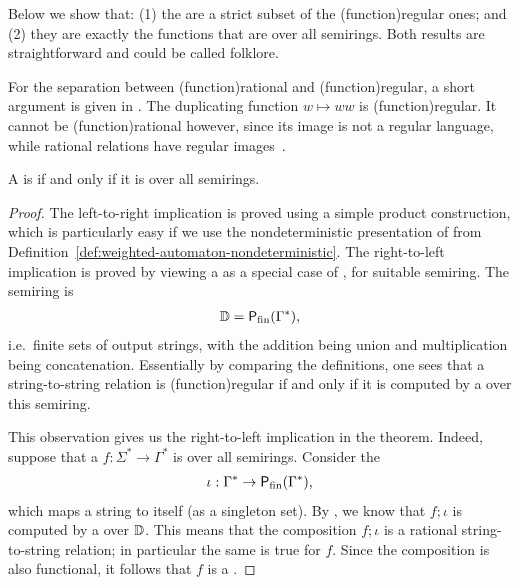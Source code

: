 \AP
Below we show that: (1) the  are a
strict subset of the \kl(function){regular} ones; and (2) they are exactly the
functions that are  over all semirings. Both results are
straightforward and could be called folklore.

\begin{myexample}
    For the separation between \kl(function){rational} and 
    \kl(function){regular}, a short argument is given in 
    \cite[p. 218]{engelfrietMSODefinableString2001}. 
    The duplicating function $w \mapsto ww$ is \kl(function){regular}.
    It cannot be \kl(function){rational} 
    however, since its image is not a regular language, 
    while rational relations have regular images~\cite[Theorem IX.3.1]{Eilenberg74}.
\end{myexample}

\begin{theorem}\label{thm:rational-functions}
  \AP
  A  is  if and only if it is 
   over all semirings.
\end{theorem}
\begin{proof}
    The left-to-right implication is proved using a simple product
    construction, which is particularly easy if we use the nondeterministic
    presentation of  from
    Definition~\ref{def:weighted-automaton-nondeterministic}. The right-to-left
    implication is proved by viewing a  as a
    special case of , for suitable semiring. The semiring is 
    \begin{align*}
    \mathbb D = \mathsf{P}_{\mathrm{fin}}(\Gamma^*),
    \end{align*}
    i.e.~finite sets of output strings, with the addition being union and
    multiplication being concatenation. Essentially by comparing the
    definitions, one sees that a string-to-string relation is \kl(function){regular}
    if and only if it is computed by a  over this semiring. 

    This observation gives us the right-to-left implication in the theorem.
    Indeed, suppose that a  $f : \Sigma^* \to
    \Gamma^*$ is  over all semirings. 
    Consider the 
    \begin{align*}
    \iota : \Gamma^* \to \mathsf{P}_{\mathrm{fin}}(\Gamma^*),
    \end{align*}
    which maps a string to itself (as a singleton set). By , we know
    that $f; \iota$ is computed by a  over $\mathbb D$. This
    means that the composition $f;\iota$ is a rational string-to-string
    relation; in particular the same is true for $f$. Since the composition is
    also functional, it follows that $f$ is a .
\end{proof}


